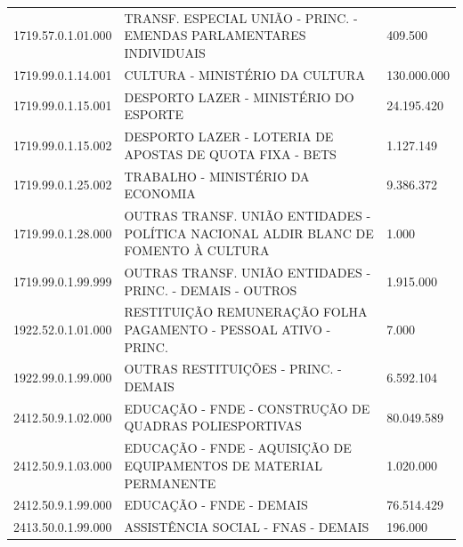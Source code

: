 \documentclass{article}
\begin{document}
\begin{longtable}[c]{m{2cm}|m{13cm}|m{2cm}}
\multicolumn{1}{C{2cm}|}{1719.57.0.1.01.000} & \multicolumn{1}{L{13cm}|}{TRANSF. ESPECIAL UNIÃO - PRINC. - EMENDAS PARLAMENTARES INDIVIDUAIS} & \multicolumn{1}{R{2cm}}{409.500} \\
\multicolumn{1}{C{2cm}|}{1719.99.0.1.14.001} & \multicolumn{1}{L{13cm}|}{CULTURA - MINISTÉRIO DA CULTURA} & \multicolumn{1}{R{2cm}}{130.000.000} \\
\multicolumn{1}{C{2cm}|}{1719.99.0.1.15.001} & \multicolumn{1}{L{13cm}|}{DESPORTO LAZER - MINISTÉRIO DO ESPORTE} & \multicolumn{1}{R{2cm}}{24.195.420} \\
\multicolumn{1}{C{2cm}|}{1719.99.0.1.15.002} & \multicolumn{1}{L{13cm}|}{DESPORTO LAZER - LOTERIA DE APOSTAS DE QUOTA FIXA - BETS} & \multicolumn{1}{R{2cm}}{1.127.149} \\
\multicolumn{1}{C{2cm}|}{1719.99.0.1.25.002} & \multicolumn{1}{L{13cm}|}{TRABALHO - MINISTÉRIO DA ECONOMIA} & \multicolumn{1}{R{2cm}}{9.386.372} \\
\multicolumn{1}{C{2cm}|}{1719.99.0.1.28.000} & \multicolumn{1}{L{13cm}|}{OUTRAS TRANSF. UNIÃO ENTIDADES - POLÍTICA NACIONAL ALDIR BLANC DE FOMENTO À CULTURA} & \multicolumn{1}{R{2cm}}{1.000} \\
\multicolumn{1}{C{2cm}|}{1719.99.0.1.99.999} & \multicolumn{1}{L{13cm}|}{OUTRAS TRANSF. UNIÃO ENTIDADES - PRINC. - DEMAIS - OUTROS} & \multicolumn{1}{R{2cm}}{1.915.000} \\
\multicolumn{1}{C{2cm}|}{1922.52.0.1.01.000} & \multicolumn{1}{L{13cm}|}{RESTITUIÇÃO REMUNERAÇÃO FOLHA PAGAMENTO - PESSOAL ATIVO - PRINC.} & \multicolumn{1}{R{2cm}}{7.000} \\
\multicolumn{1}{C{2cm}|}{1922.99.0.1.99.000} & \multicolumn{1}{L{13cm}|}{OUTRAS RESTITUIÇÕES - PRINC. - DEMAIS} & \multicolumn{1}{R{2cm}}{6.592.104} \\
\multicolumn{1}{C{2cm}|}{2412.50.9.1.02.000} & \multicolumn{1}{L{13cm}|}{EDUCAÇÃO - FNDE - CONSTRUÇÃO DE QUADRAS POLIESPORTIVAS} & \multicolumn{1}{R{2cm}}{80.049.589} \\
\multicolumn{1}{C{2cm}|}{2412.50.9.1.03.000} & \multicolumn{1}{L{13cm}|}{EDUCAÇÃO - FNDE - AQUISIÇÃO DE EQUIPAMENTOS DE MATERIAL PERMANENTE} & \multicolumn{1}{R{2cm}}{1.020.000} \\
\multicolumn{1}{C{2cm}|}{2412.50.9.1.99.000} & \multicolumn{1}{L{13cm}|}{EDUCAÇÃO - FNDE - DEMAIS} & \multicolumn{1}{R{2cm}}{76.514.429} \\
\multicolumn{1}{C{2cm}|}{2413.50.0.1.99.000} & \multicolumn{1}{L{13cm}|}{ASSISTÊNCIA SOCIAL - FNAS - DEMAIS} & \multicolumn{1}{R{2cm}}{196.000} \\

\end{longtable}
\end{document}
